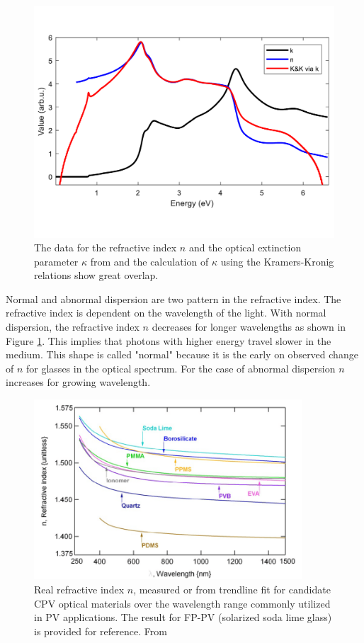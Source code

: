 \begin{figure}
    \centering
    \includegraphics[width = 12cm]{Bilder/Grundlagen/KramersKronig.pdf}
    \caption{The data for the refractive index $n$ and the optical extinction parameter $\kappa$ from \cite{Nunley.2016} and the calculation of $\kappa$ using the Kramers-Kronig relations show great overlap.} 
\end{figure}

Normal and abnormal dispersion are two pattern in the refractive index. The refractive index is dependent on the
wavelength of the light. With normal dispersion, the refractive index $n$ decreases for longer wavelengths as shown in Figure \ref{fig:nglass}. This implies that photons 
with higher energy travel slower in the medium. This shape is called "normal" because it is the early on observed 
change of $n$ for glasses in the optical spectrum. For the case of abnormal dispersion $n$ increases
for growing wavelength.

\begin{figure}[ht]
    \centering
    \includegraphics[width = 10cm]{Bilder/Grundlagen/DispersionGlass.png}
    \caption{Real refractive index $n$, measured or from trendline fit for candidate CPV optical materials over the wavelength range commonly utilized in PV applications. The result for FP-PV (solarized soda lime glass) is provided for reference. From \cite{Miller.2009}}
    \label{fig:nglass}
\end{figure}